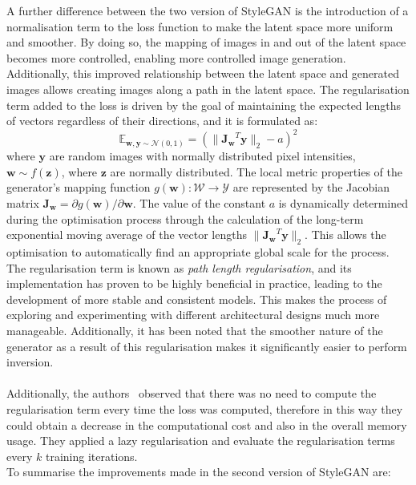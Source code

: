 \noindent A further difference between the two version of StyleGAN is the introduction of a normalisation term to the loss function to make the latent space more uniform and smoother. By doing so, the mapping of images in and out of the latent space becomes more controlled, enabling more controlled image generation. Additionally, this improved relationship between the latent space and generated images allows creating images along a path in the latent space. The regularisation term added to the loss is driven by the goal of maintaining the expected lengths of vectors regardless of their directions, and it is formulated as:
\begin{equation}
    \mathbb{E}_{\mathbf{w,y}\sim \mathcal{N}(0,1)}=(\| \mathbf{J_w}^T\mathbf{y}\|_2 - a)^2
\end{equation}
where $\mathbf{y}$ are random images with normally distributed pixel intensities, $\mathbf{w} \sim f(\mathbf{z})$, where $\mathbf{z}$ are normally distributed. The local metric properties of the generator's mapping function $g(\mathbf{w}): \mathcal{W}\rightarrow \mathcal{Y}$ are represented by the Jacobian matrix $\mathbf{J_w}=\partial g(\mathbf{w})/\partial \mathbf{w}$.
The value of the constant $a$ is dynamically determined during the optimisation process through the calculation of the long-term exponential moving average of the vector lengths $\| \mathbf{J_w}^T\mathbf{y} \|_2$. This allows the optimisation to automatically find an appropriate global scale for the process.\\
The regularisation term is known as \textit{path length regularisation}, and its implementation has proven to be highly beneficial in practice, leading to the development of more stable and consistent models. This makes the process of exploring and experimenting with different architectural designs much more manageable. Additionally, it has been noted that the smoother nature of the generator as a result of this regularisation makes it significantly easier to perform inversion.\\ \\
Additionally, the authors~\cite{Karras2019stylegan2} observed that there was no need to compute the regularisation term every time the loss was computed, therefore in this way they could obtain a decrease in the computational cost and also in the overall memory usage. They applied a lazy regularisation and evaluate the regularisation terms every $k$ training iterations.\\
To summarise the improvements made in the second version of StyleGAN are:
